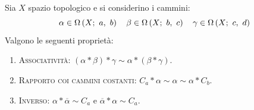 \begin{proposition}~{}\label{propcammini}\\
Sia $X$ spazio topologico e si considerino i cammini:
	\begin{equation*}
	\alpha\in\Omega\left(X;\ a,\ b\right)\quad\beta\in\Omega\left(X;\ b,\ c\right)\quad\gamma\in\Omega\left(X;\ c,\ d\right)
	\end{equation*}
Valgono le seguenti proprietà:
\begin{enumerate}
	\item \textsc{Associatività}: $\left(\alpha\ast\beta\right)\ast \gamma \sim \alpha\ast\left(\beta\ast\gamma\right)$.
	\item \textsc{Rapporto coi cammini costanti}: $C_a\ast \alpha \sim \alpha \sim \alpha \ast C_b$.
	\item \textsc{Inverso}: $\alpha\ast\overline{\alpha}\sim C_a$ e $\overline{\alpha}\ast\alpha\sim C_a$.
\end{enumerate}
\vspace{-3mm}
\end{proposition}
